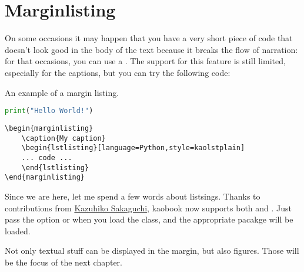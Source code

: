 \section{Marginlisting}

On some occasions it may happen that you have a very short piece of code 
that doesn't look good in the body of the text because it breaks the 
flow of narration: for that occasions, you can use a 
. The support for this feature is still 
limited, especially for the captions, but you can try the following 
code:

\begin{marginlisting}
	\caption{An example of a margin listing.}
	\begin{lstlisting}[language=Python,style=kaolstplain]
print("Hello World!")
	\end{lstlisting}
\end{marginlisting}

\begin{verbatim}
\begin{marginlisting}
	\caption{My caption}
	\begin{lstlisting}[language=Python,style=kaolstplain]
	... code ...
	\end{lstlisting}
\end{marginlisting}
\end{verbatim}

Since we are here, let me spend a few words about listsings. Thanks to contributions from \href{https://github.com/fmarotta/kaobook/pull/225}{Kazuhiko Sakaguchi}, kaobook now supports both  and . Just pass the option  or  when you load the  class, and the appropriate pacakge will be loaded.

Not only textual stuff can be displayed in the margin, but also figures. 
Those will be the focus of the next chapter.
